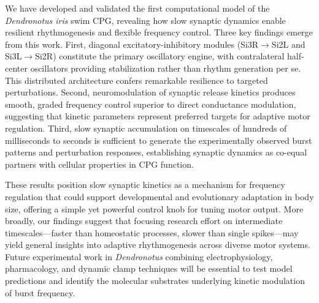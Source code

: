 \documentclass[nofootinbib,aip,amsmath,amssymb,preprint,twocolumn,floatfix,10pt]{revtex4-2}
\begin{document}
We have developed and validated the first computational model of the \textit{Dendronotus iris} swim CPG, revealing how slow synaptic dynamics enable resilient rhythmogenesis and flexible frequency control. Three key findings emerge from this work. First, diagonal excitatory-inhibitory modules (Si3R$\to$Si2L and Si3L$\to$Si2R) constitute the primary oscillatory engine, with contralateral half-center oscillators providing stabilization rather than rhythm generation per se. This distributed architecture confers remarkable resilience to targeted perturbations. Second, neuromodulation of synaptic release kinetics produces smooth, graded frequency control superior to direct conductance modulation, suggesting that kinetic parameters represent preferred targets for adaptive motor regulation. Third, slow synaptic accumulation on timescales of hundreds of milliseconds to seconds is sufficient to generate the experimentally observed burst patterns and perturbation responses, establishing synaptic dynamics as co-equal partners with cellular properties in CPG function.

These results position slow synaptic kinetics as a mechanism for frequency regulation that could support developmental and evolutionary adaptation in body size, offering a simple yet powerful control knob for tuning motor output. More broadly, our findings suggest that focusing research effort on intermediate timescales---faster than homeostatic processes, slower than single spikes---may yield general insights into adaptive rhythmogenesis across diverse motor systems. Future experimental work in \textit{Dendronotus} combining electrophysiology, pharmacology, and dynamic clamp techniques will be essential to test model predictions and identify the molecular substrates underlying kinetic modulation of burst frequency.

\label{fig:supp} 
\end{document}
